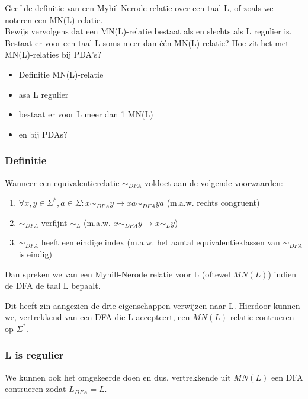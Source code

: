 
\begin{question}
  Geef de definitie van een Myhil-Nerode relatie over een taal L, of zoals we noteren een MN(L)-relatie. \\
  Bewijs vervolgens dat een MN(L)-relatie bestaat als en slechts als L regulier is. Bestaat er voor een taal L soms meer dan één MN(L) relatie? Hoe zit het met MN(L)-relaties bij PDA’s?
\end{question}

\begin{itemize}
  \item Definitie MN(L)-relatie
  \item asa L regulier
  \item bestaat er voor L meer dan 1 MN(L)
  \item en bij PDAs?
\end{itemize}

\subsubsection*{Definitie}

\begin{theorem}
  Wanneer een equivalentierelatie $\sim_{DFA}$ voldoet aan de volgende voorwaarden:
  \begin{enumerate}
    \item $\forall x, y \in \Sigma^*, a \in \Sigma : x \sim_{DFA} y \rightarrow xa \sim_{DFA} ya$ (m.a.w. rechts congruent)
    \item $\sim_{DFA}$ verfijnt $\sim_L$ (m.a.w. $x \sim_{DFA} y \rightarrow x \sim_L y$)
    \item $\sim_{DFA}$ heeft een eindige index (m.a.w. het aantal equivalentieklassen van $\sim_{DFA}$ is eindig)
  \end{enumerate}
  Dan spreken we van een Myhill-Nerode relatie voor L (oftewel $MN(L)$) indien de DFA de taal L bepaalt.
\end{theorem}

Dit heeft zin aangezien de drie eigenschappen verwijzen naar L. Hierdoor kunnen we, vertrekkend van een DFA die L accepteert, een $MN(L)$ relatie contrueren op $\Sigma^*$.

\subsubsection*{L is regulier}

We kunnen ook het omgekeerde doen en dus, vertrekkende uit $MN(L)$ een DFA contrueren zodat $L_{DFA} = L$.

